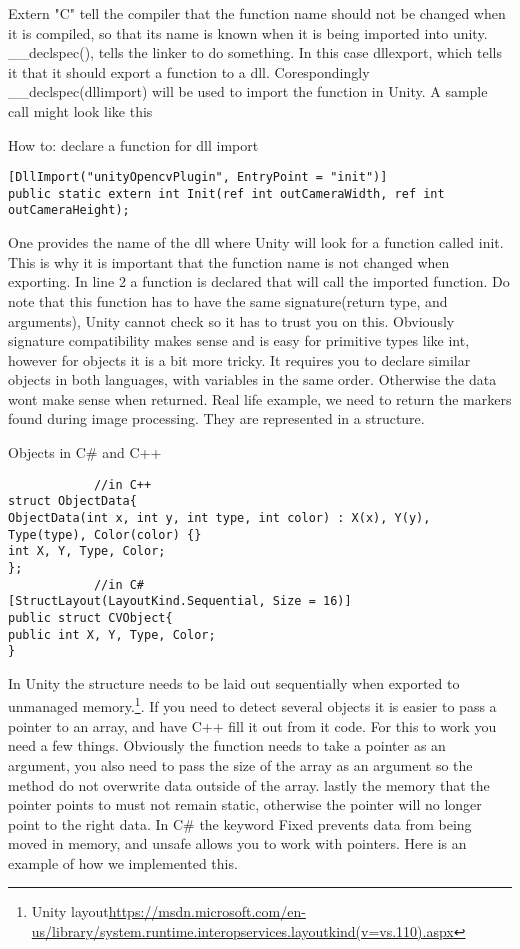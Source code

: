 Extern "C" tell the compiler that the function name should not be changed when it is compiled, so that its name is known when it is being imported into unity. \_\_declspec(), tells the linker to do something. In this case dllexport, which tells it that it should export a function to a dll. Corespondingly \_\_declspec(dllimport) will be used to import the function in Unity. A sample call might look like this\\
\begin{listing}[H]
	\caption{How to: declare a function for dll import}
	\label{listing:dllImport}
	\begin{verbatim}
[DllImport("unityOpencvPlugin", EntryPoint = "init")]
public static extern int Init(ref int outCameraWidth, ref int outCameraHeight);
	\end{verbatim}
\end{listing}
One provides the name of the dll where Unity will look for a function called init. This is why it is important that the function name is not changed when exporting. In line 2 a function is declared that will call the imported function. Do note that this function has to have the same signature(return type, and arguments), Unity cannot check so it has to trust you on this. Obviously signature compatibility makes sense and is easy for primitive types like int, however for objects it is a bit more tricky. It requires you to declare similar objects in both languages, with variables in the same order. Otherwise the data wont make sense when returned. Real life example, we need to return the markers found during image processing. They are represented in a structure. 
\begin{listing}[H]
	\caption{Objects in C\# and C++}
	\label{listing:objects}
	\begin{verbatim}
			//in C++
struct ObjectData{
ObjectData(int x, int y, int type, int color) : X(x), Y(y), Type(type), Color(color) {}
int X, Y, Type, Color;
};
			//in C#	
[StructLayout(LayoutKind.Sequential, Size = 16)]
public struct CVObject{
public int X, Y, Type, Color;
}
	\end{verbatim}
\end{listing}
In Unity the structure needs to be laid out sequentially when exported to unmanaged memory.\footnote{Unity layout\url{https://msdn.microsoft.com/en-us/library/system.runtime.interopservices.layoutkind(v=vs.110).aspx}}. If you need to detect several objects it is easier to pass a pointer to an array, and have C++ fill it out from it code. For this to work you need a few things. Obviously the function needs to take a pointer as an argument, you also need to pass the size of the array as an argument so the method do not overwrite data outside of the array. lastly the memory that the pointer points to must not remain static, otherwise the pointer will no longer point to the right data. In C\# the keyword Fixed prevents data from being moved in memory, and unsafe allows you to work with pointers. Here is an example of how we implemented this.
